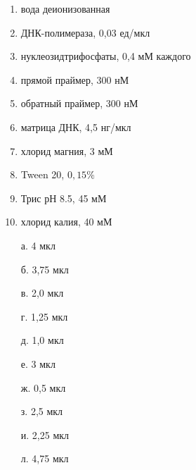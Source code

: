 \begin{multicols}{2}
    {
        \begin{enumerate}
            \item вода деионизованная
            \item ДНК-полимераза, 0,03 ед/мкл
            \item нуклеозидтрифосфаты, 0,4 мМ каждого
            \item прямой праймер, 300 нМ
            \item обратный праймер, 300 нМ
            \item матрица ДНК, 4,5 нг/мкл
            \item хлорид магния, 3 мМ
            \item Tween 20, $0,15\%$
            \item Трис рН 8.5, 45 мМ
            \item хлорид калия, 40 мМ
        \end{enumerate}
    }
    {
        \begin{enumerate}
            \item[а.] 4 мкл
            \item[б.] 3,75 мкл
            \item[в.] 2,0 мкл
            \item[г.] 1,25 мкл
            \item[д.] 1,0 мкл
            \item[е.] 3 мкл
            \item[ж.] 0,5 мкл
            \item[з.] 2,5 мкл
            \item[и.] 2,25 мкл
            \item[л.] 4,75 мкл
        \end{enumerate}
    }
    
\end{multicols}
